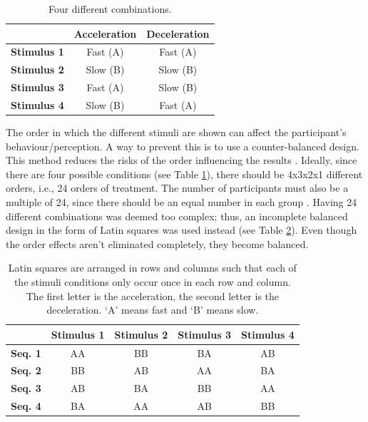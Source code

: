 \begin{table} \centering
\caption{Four different combinations.}
\label{tab:combinations}
\begin{tabular}{ccc}
\toprule
& \textbf{Acceleration} & \textbf{Deceleration} \\
\midrule
\textbf{Stimulus 1} & Fast (A) & Fast (A)\\
\textbf{Stimulus 2} & Slow (B) & Slow (B)\\
\textbf{Stimulus 3} & Fast (A) & Slow (B)\\
\textbf{Stimulus 4} & Slow (B) & Fast (A)\\
\bottomrule
\end{tabular}
\end{table}

The order in which the different stimuli are shown can affect the participant's behaviour/perception. A way to prevent this is to use a counter-balanced design. This method reduces the risks of the order influencing the results \cite{experimental2}. Ideally, since there are four possible conditions (see Table \ref{tab:combinations}), there should be 4x3x2x1 different orders, i.e., 24 orders of treatment. The number of participants must also be a multiple of 24, since there should be an equal number in each group \cite{experimental2}. Having 24 different combinations was deemed too complex; thus, an incomplete balanced design in the form of Latin squares was used instead (see Table \ref{table:latin}). Even though the order effects aren't eliminated completely, they become balanced.

\begin{table} \centering
\scriptsize
\caption{Latin squares are arranged in rows and columns such that each of the stimuli conditions only occur once in each row and column. The first letter is the acceleration, the second letter is the deceleration. `A' means fast and `B' means slow.}
\label{table:latin}
\begin{tabular}{ccccc}
\toprule
& \textbf{Stimulus 1} & \textbf{Stimulus 2} & \textbf{Stimulus 3} & \textbf{Stimulus 4}\\
\midrule
\textbf{Seq. 1} & AA & BB & BA & AB\\
\textbf{Seq. 2} & BB & AB & AA & BA\\
\textbf{Seq. 3} & AB & BA & BB & AA\\
\textbf{Seq. 4} & BA & AA & AB & BB\\
\bottomrule
\end{tabular}
\end{table}

